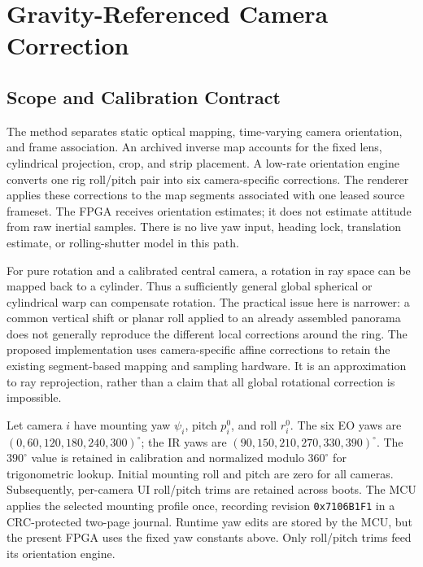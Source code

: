 
\section{Gravity-Referenced Camera Correction}
\label{sec:gl_algorithm}
\label{sec:algorithm}

\subsection{Scope and Calibration Contract}
The method separates static optical mapping, time-varying camera orientation,
and frame association. An archived inverse map accounts for the fixed lens,
cylindrical projection, crop, and strip placement. A low-rate orientation
engine converts one rig roll/pitch pair into six camera-specific corrections.
The renderer applies these corrections to the map segments associated with
one leased source frameset. The FPGA receives orientation estimates; it does
not estimate attitude from raw inertial samples. There is no live yaw input,
heading lock, translation estimate, or rolling-shutter model in this path.

For pure rotation and a calibrated central camera, a rotation in ray space
can be mapped back to a cylinder. Thus a sufficiently general global
spherical or cylindrical warp can compensate rotation. The practical issue
here is narrower: a common vertical shift or planar roll applied to an
already assembled panorama does not generally reproduce the different local
corrections around the ring. The proposed implementation uses camera-specific
affine corrections to retain the existing segment-based mapping and sampling
hardware. It is an approximation to ray reprojection, rather than a claim
that all global rotational correction is impossible.

Let camera $i$ have mounting yaw $\psi_i$, pitch $p_i^0$, and roll $r_i^0$.
The six EO yaws are $(0,60,120,180,240,300)^\circ$; the IR yaws are
$(90,150,210,270,330,390)^\circ$. The $390^\circ$ value is retained in
calibration and normalized modulo $360^\circ$ for trigonometric lookup.
Initial mounting roll and pitch are zero for all cameras. Subsequently,
per-camera UI roll/pitch trims are retained across boots. The MCU applies
the selected mounting profile once, recording revision \texttt{0x7106B1F1}
in a CRC-protected two-page journal. Runtime yaw edits are stored by the MCU,
but the present FPGA uses the fixed yaw constants above. Only roll/pitch
trims feed its orientation engine.

